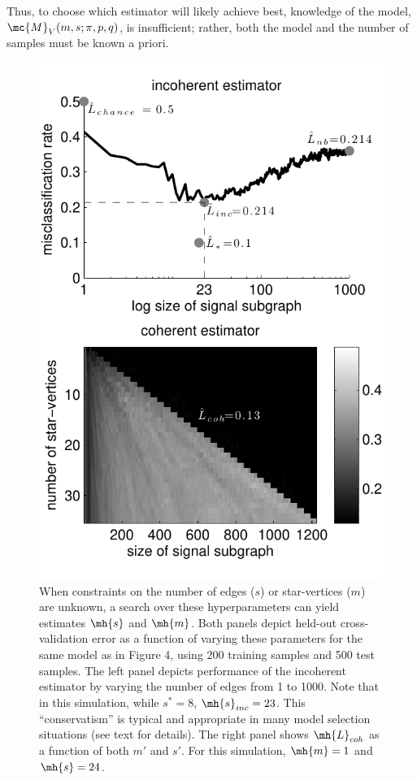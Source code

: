 \documentclass[10pt,journal,cspaper,compsoc]{IEEEtran}
\begin{document}
\begin{figure}[htbp]
	\label{fig:RE}
\end{figure}

Thus, to choose which estimator will likely achieve best, knowledge of the model, $\mc{M}_V(m,s;\pi,p,q)$, is insufficient; rather, both the model and the number of samples must be known a priori.  

\begin{figure}[htbp]
	\centering
		\includegraphics[width=1.0\linewidth]{../figs/coherent_image_V70_s20_p10_q30_nTr200_nTe500.pdf}
	\caption{ When constraints on the number of edges ($s$) or star-vertices ($m$) are unknown, a search over these hyperparameters can yield estimates $\mh{s}$ and $\mh{m}$.  Both panels depict held-out cross-validation error as a function of varying these parameters for the same model as in Figure 4, using 200 training samples and 500 test samples.  The left panel depicts performance of the incoherent estimator by varying the number of edges from 1 to 1000. Note that in this simulation, while $s^*=8$, $\mh{s}_{inc}=23$.  This ``conservatism'' is typical and appropriate in many model selection situations (see text for details).  The right panel shows $\mh{L}_{coh}$ as a function of both $m'$ and $s'$.  For this simulation, $\mh{m}=1$ and $\mh{s}=24$.}
	\label{fig:coherent}
\end{figure}
\end{document}
